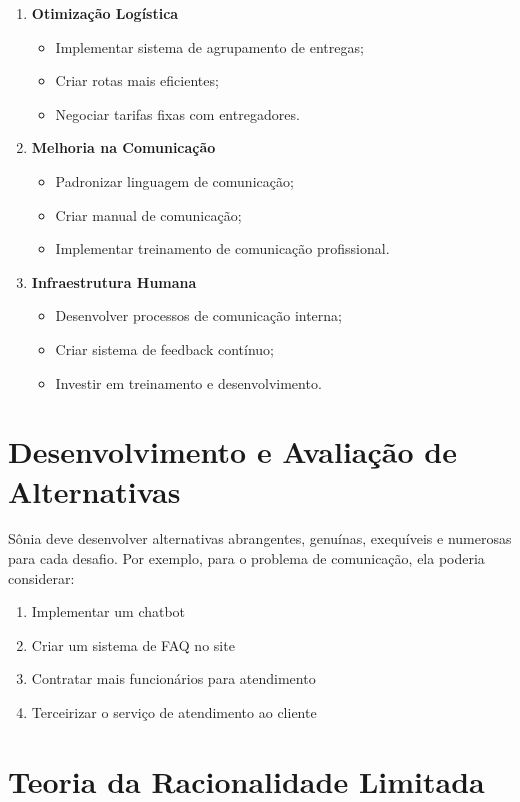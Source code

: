 \documentclass[11pt]{article}
\begin{document}
\begin{enumerate}
    \item \textbf{Otimização Logística}
    \begin{itemize}
        \item Implementar sistema de agrupamento de entregas;
        \item Criar rotas mais eficientes;
        \item Negociar tarifas fixas com entregadores.
    \end{itemize}
    \item \textbf{Melhoria na Comunicação}
    \begin{itemize}
        \item Padronizar linguagem de comunicação;
        \item Criar manual de comunicação;
        \item Implementar treinamento de comunicação profissional.
    \end{itemize}
    \item \textbf{Infraestrutura Humana}
    \begin{itemize}
        \item Desenvolver processos de comunicação interna;
        \item Criar sistema de feedback contínuo;
        \item Investir em treinamento e desenvolvimento.
    \end{itemize}
\end{enumerate}

\section{Desenvolvimento e Avaliação de Alternativas}

Sônia deve desenvolver alternativas abrangentes, genuínas, exequíveis e numerosas para cada desafio. Por exemplo, para o problema de comunicação, ela poderia considerar:

\begin{enumerate}
    \item Implementar um chatbot
    \item Criar um sistema de FAQ no site
    \item Contratar mais funcionários para atendimento
    \item Terceirizar o serviço de atendimento ao cliente
\end{enumerate}

\section{Teoria da Racionalidade Limitada}
\end{document}
